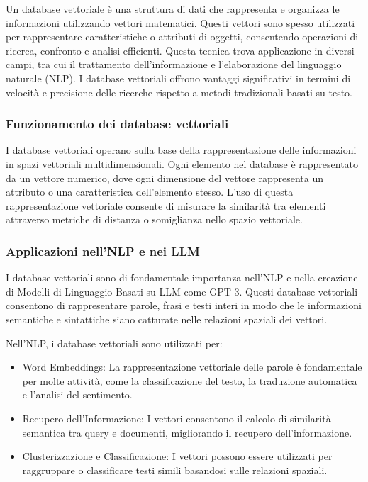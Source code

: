 Un database vettoriale è una struttura di dati che rappresenta e organizza le informazioni utilizzando vettori matematici. Questi vettori sono spesso utilizzati per rappresentare caratteristiche o attributi di oggetti, consentendo operazioni di ricerca, confronto e analisi efficienti. Questa tecnica trova applicazione in diversi campi, tra cui il trattamento dell'informazione e l'elaborazione del linguaggio naturale (NLP). I database vettoriali offrono vantaggi significativi in termini di velocità e precisione delle ricerche rispetto a metodi tradizionali basati su testo.

\subsubsection{Funzionamento dei database vettoriali}

I database vettoriali operano sulla base della rappresentazione delle informazioni in spazi vettoriali multidimensionali. Ogni elemento nel database è rappresentato da un vettore numerico, dove ogni dimensione del vettore rappresenta un attributo o una caratteristica dell'elemento stesso. L'uso di questa rappresentazione vettoriale consente di misurare la similarità tra elementi attraverso metriche di distanza o somiglianza nello spazio vettoriale.

\subsubsection{Applicazioni nell'NLP e nei LLM}

I database vettoriali sono di fondamentale importanza nell'NLP e nella creazione di Modelli di Linguaggio Basati su LLM come GPT-3. Questi database vettoriali consentono di rappresentare parole, frasi e testi interi in modo che le informazioni semantiche e sintattiche siano catturate nelle relazioni spaziali dei vettori.

Nell'NLP, i database vettoriali sono utilizzati per:
\begin{itemize}
    \item Word Embeddings: La rappresentazione vettoriale delle parole è fondamentale per molte attività, come la classificazione del testo, la traduzione automatica e l'analisi del sentimento.
    \item Recupero dell'Informazione: I vettori consentono il calcolo di similarità semantica tra query e documenti, migliorando il recupero dell'informazione.
    \item Clusterizzazione e Classificazione: I vettori possono essere utilizzati per raggruppare o classificare testi simili basandosi sulle relazioni spaziali.

\end{itemize}

